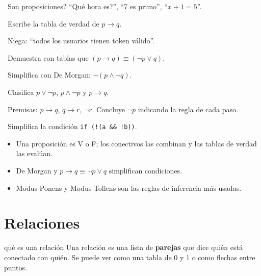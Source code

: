 \begin{tmejercicios}
\label{ej:1-2}
\begin{tmlista}
\item \tmbasico\ \textquestiondown Son proposiciones? ``\textquestiondown Qu\'e hora es?'', ``7 es primo'', ``$x+1=5$''.
\item \tmbasico\ Escribe la tabla de verdad de $p\to q$.
\item \tmbasico\ Niega: ``todos los usuarios tienen token v\'alido''.
\item \tmmedio\ Demuestra con tablas que $(p\to q)\equiv(\neg p\vee q)$.
\item \tmmedio\ Simplifica con De Morgan: $\neg(p\wedge\neg q)$.
\item \tmmedio\ Clasifica $p\vee\neg p$, $p\wedge\neg p$ y $p\to q$.
\item \tmdificil\ Premisas: $p\to q$, $q\to r$, $\neg r$. Concluye $\neg p$ indicando la regla de cada paso.
\item \tmdificil\ Simplifica la condici\'on \texttt{if (!(a \&\& !b))}.
\end{tmlista}
\end{tmejercicios}


\begin{tmresumen}
\begin{itemize}
\item Una proposici\'on es V o F; los conectivos las combinan y las tablas de verdad las eval\'uan.
\item De Morgan y $p\to q\equiv\neg p\vee q$ simplifican condiciones.
\item Modus Ponens y Modus Tollens son las reglas de inferencia m\'as usadas.
\end{itemize}
\end{tmresumen}

\section{Relaciones}
\label{sec:1-3}

\begin{tmconcepto}{qu\'e es una relaci\'on}
Una relaci\'on es una lista de \textbf{parejas} que dice qui\'en est\'a conectado con qui\'en. Se puede ver como una tabla de 0 y 1 o como flechas entre puntos.
\end{tmconcepto}

